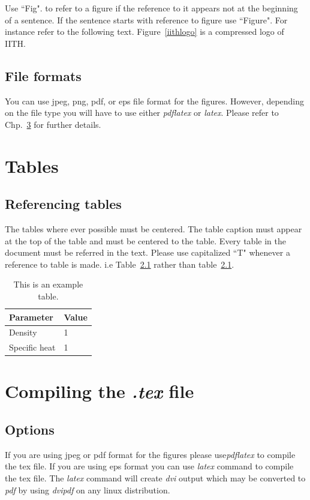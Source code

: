 \documentclass[a4paper,twoside]{iiththesis}
\begin{document}
Use ``Fig". to refer to a figure if the reference to it appears not at the beginning of a sentence. If the sentence starts with reference to figure use ``Figure". For instance refer to the following text.
Figure~\ref{iithlogo} is a compressed logo of IITH.\\

\section{File formats}
You can use jpeg, png, pdf, or eps file format for the figures. However, depending on the file type you will have to use either \textit{pdflatex} or \textit{latex}. Please refer to Chp.~\ref{compiling} for further details.


\chapter{Tables}

\section{Referencing tables}
The tables where ever possible must be centered. The table caption must appear at the top of the table and must be centered to the table. Every table in the document must be referred in the text. Please use capitalized ``T" whenever a reference to table is made. i.e Table~\ref{extable} rather than table~\ref{extable}.
\begin{table}[h]
\centering
\caption{This is an example table.}
\begin{tabular}{l l}
\hline
Parameter & Value \\
\hline
Density & 1 \\
Specific heat & 1 \\
\hline
\end{tabular}
\label{extable}
\end{table}

\chapter{Compiling the \textit{.tex} file }
\label{compiling}

\section{Options}
If you are using jpeg or pdf format for the figures please use\textit{pdflatex} to compile the tex file. If you are using eps format you can use \textit{latex} command to compile the tex file. The \textit{latex} command will create \textit{dvi} output which may be converted to \textit{pdf} by using \textit{dvipdf} on any linux distribution. 
\end{document}

